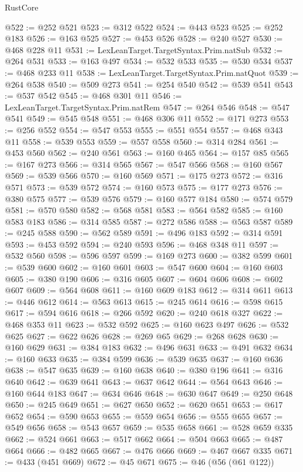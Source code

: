 \begin{lexlean}{RustCore}
\begin{coremodule}
@522 := @252 @521
@523 := @312 @522
@524 := @443 @523
@525 := @252 @183
@526 := @163 @525
@527 := @453 @526
@528 := @240 @527
@530 := @468 @228 @11
@531 := LexLeanTarget.TargetSyntax.Prim.natSub
@532 := @264 @531
@533 := @163 @497
@534 := @532 @533
@535 := @530 @534
@537 := @468 @233 @11
@538 := LexLeanTarget.TargetSyntax.Prim.natQuot
@539 := @264 @538
@540 := @509 @273
@541 := @254 @540
@542 := @539 @541
@543 := @537 @542
@545 := @468 @301 @11
@546 := LexLeanTarget.TargetSyntax.Prim.natRem
@547 := @264 @546
@548 := @547 @541
@549 := @545 @548
@551 := @468 @306 @11
@552 := @171 @273
@553 := @256 @552
@554 := @547 @553
@555 := @551 @554
@557 := @468 @343 @11
@558 := @539 @553
@559 := @557 @558
@560 := @314 @284
@561 := @453 @560
@562 := @240 @561
@563 := @160 @465
@564 := @157 @85
@565 := @167 @273
@566 := @314 @565
@567 := @547 @566
@568 := @160 @567
@569 := @539 @566
@570 := @160 @569
@571 := @175 @273
@572 := @316 @571
@573 := @539 @572
@574 := @160 @573
@575 := @177 @273
@576 := @380 @575
@577 := @539 @576
@579 := @160 @577 @184
@580 := @574 @579
@581 := @570 @580
@582 := @568 @581
@583 := @564 @582
@585 := @160 @583 @183
@586 := @314 @585
@587 := @272 @586
@588 := @563 @587
@589 := @245 @588
@590 := @562 @589
@591 := @496 @183
@592 := @314 @591
@593 := @453 @592
@594 := @240 @593
@596 := @468 @348 @11
@597 := @532 @560
@598 := @596 @597
@599 := @169 @273
@600 := @382 @599
@601 := @539 @600
@602 := @160 @601
@603 := @547 @600
@604 := @160 @603
@605 := @380 @190
@606 := @316 @605
@607 := @604 @606
@608 := @602 @607
@609 := @564 @608
@611 := @160 @609 @183
@612 := @314 @611
@613 := @446 @612
@614 := @563 @613
@615 := @245 @614
@616 := @598 @615
@617 := @594 @616
@618 := @266 @592
@620 := @240 @618 @327
@622 := @468 @353 @11
@623 := @532 @592
@625 := @160 @623 @497
@626 := @532 @625
@627 := @622 @626
@628 := @269 @65
@629 := @268 @628
@630 := @160 @629
@631 := @384 @183
@632 := @496 @631
@633 := @491 @632
@634 := @160 @633
@635 := @384 @599
@636 := @539 @635
@637 := @160 @636
@638 := @547 @635
@639 := @160 @638
@640 := @380 @196
@641 := @316 @640
@642 := @639 @641
@643 := @637 @642
@644 := @564 @643
@646 := @160 @644 @183
@647 := @634 @646
@648 := @630 @647
@649 := @250 @648
@650 := @245 @649
@651 := @627 @650
@652 := @620 @651
@653 := @617 @652
@654 := @590 @653
@655 := @559 @654
@656 := @555 @655
@657 := @549 @656
@658 := @543 @657
@659 := @535 @658
@661 := @528 @659 @335
@662 := @524 @661
@663 := @517 @662
@664 := @504 @663
@665 := @487 @664
@666 := @482 @665
@667 := @476 @666
@669 := @467 @667 @335
@671 := @433 (@451 @669)
@672 := @45 @671
@675 := @46 (@56 (@61 @122))

\end{coremodule}
\end{lexlean}
